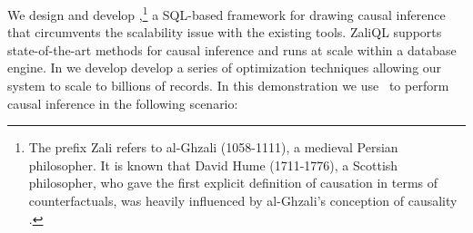 We design and develop \GSQL,\footnote{ The prefix Zali refers to
  al-Ghzali (1058-1111), a medieval Persian philosopher. It is known
  that David Hume (1711-1776), a Scottish philosopher, who gave the
  first explicit definition of causation in terms of counterfactuals,
  was heavily influenced by al-Ghzali's conception of causality
  \cite{shalizi2013advanced}.}  a SQL-based framework for drawing
causal inference that circumvents the scalability issue with the
existing tools.  ZaliQL supports state-of-the-art methods for causal
inference and runs at scale within a database engine.  In \GSQL we develop
develop a series of optimization techniques allowing our system to
scale to billions of records.   In this demonstration we use \GSQL \ to perform causal inference in the following scenario:





